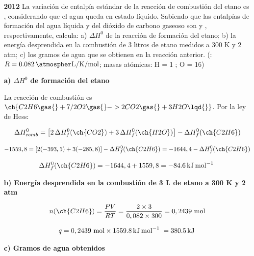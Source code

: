 \begin{exerciseEVAU}
    \textbf{2012} La variación de entalpía estándar de la reacción de combustión del etano es , considerando que el agua queda en estado líquido. Sabiendo que las entalpías de formación del agua líquida y del dióxido de carbono gaseoso son   y , respectivamente, calcula: a) \(\Delta H^0\) de la reacción de formación del etano; b) la energía desprendida en la combustión de 3 litros de etano medidos a 300 K y 2 atm; c) los gramos de agua que se obtienen en la reacción anterior.
    (\datos{}: \(R = \ctegases\); masas atómicas: H = 1 ; O = 16)

    \begin{solu}

        \textbf{a) \(\Delta H^0\) de formación del etano}

        La reacción de combustión es \(\ch{C2H6 \gas{} + 7/2 O2 \gas{} -> 2 CO2 \gas{} + 3 H2O \lqd{}}\). Por la ley de Hess:

        \begin{equation*}
            \Delta H^0_{comb} = \left[ 2\, \Delta H^0_f (\ch{CO2}) + 3\, \Delta H^0_f (\ch{H2O}) \right] - \Delta H^0_f (\ch{C2H6})
        \end{equation*}

        \begin{equation*}
            -1559,8 = \left[ 2(-393,5) + 3(-285,8) \right] - \Delta H^0_f (\ch{C2H6}) = -1644,4 - \Delta H^0_f (\ch{C2H6})
        \end{equation*}

        \begin{equation*}
            \Delta H^0_f (\ch{C2H6}) = -1644,4 + 1559,8 = \energia[kjmol]{-84.6}
        \end{equation*}

        \textbf{b) Energía desprendida en la combustión de 3 L de etano a 300 K y 2 atm}

        \begin{equation*}
            n(\ch{C2H6}) = \dfrac{PV}{RT} = \dfrac{2 \times 3}{0,082 \times 300} = 0,2439 \ \text{mol}
        \end{equation*}

        \begin{equation*}
            q = 0,2439 \ \text{mol} \times \energia[kjmol]{1559.8} = \energia[kj]{380.5}
        \end{equation*}

        \textbf{c) Gramos de agua obtenidos}


\end{solu}
\end{exerciseEVAU}
